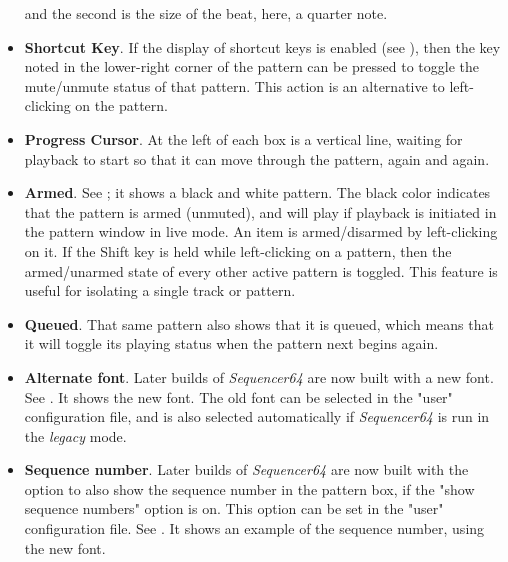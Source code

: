 \begin{itemize}
         and the second is the size of the beat, here, a quarter note.
      \item \textbf{Shortcut Key}.
         If the display of shortcut keys is enabled (see
         ),
         then the key noted in the lower-right corner of the pattern can be
         pressed to toggle the mute/unmute status of that pattern.
         This action is an alternative to left-clicking on the pattern.
      \item \textbf{Progress Cursor}.
         At the left of each box is a vertical line, waiting for playback to
         start so that it can move through the pattern, again and again.
      \item \textbf{Armed}.
         See ; it shows a black
         and white pattern.  The black color indicates that the pattern is armed
         (unmuted), and will play if playback is initiated in the pattern
         window in live mode.
         An item is armed/disarmed by left-clicking on it.
         If the Shift key is held while left-clicking on a pattern, then
         the armed/unarmed state of every other active pattern is toggled.
         This feature is useful for isolating a single track or pattern.
      \item \textbf{Queued}.
         That same pattern also shows that it is queued, which means that it
         will toggle its playing status when the pattern next begins again.
      \item \textbf{Alternate font}.
         Later builds of \textsl{Sequencer64} are now built with a new font.
         See .  It shows the new
         font. 
         The old font can be selected in the "user" configuration file, and is
         also selected automatically if \textsl{Sequencer64} is run in the
         \textsl{legacy} mode.
      \item \textbf{Sequence number}.
         Later builds of \textsl{Sequencer64} are now built with the option to
         also show the sequence number in the pattern box, if the "show
         sequence numbers" option is on.
         This option can be set in the "user" configuration file.
         See .  It shows an
         example of the sequence number, using the new font.
   \end{itemize}

